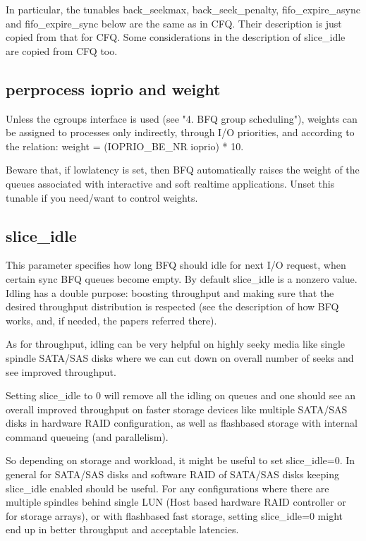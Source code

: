\documentclass[a4paper,11pt,english]{sphinxmanual}
\begin{document}
In particular, the tunables back\_seek\sphinxhyphen{}max, back\_seek\_penalty,
fifo\_expire\_async and fifo\_expire\_sync below are the same as in
CFQ. Their description is just copied from that for CFQ. Some
considerations in the description of slice\_idle are copied from CFQ
too.


\subsection{per\sphinxhyphen{}process ioprio and weight}
\label{\detokenize{bfq-iosched:per-process-ioprio-and-weight}}
Unless the cgroups interface is used (see "4. BFQ group scheduling"),
weights can be assigned to processes only indirectly, through I/O
priorities, and according to the relation:
weight = (IOPRIO\_BE\_NR \sphinxhyphen{} ioprio) * 10.

Beware that, if low\sphinxhyphen{}latency is set, then BFQ automatically raises the
weight of the queues associated with interactive and soft real\sphinxhyphen{}time
applications. Unset this tunable if you need/want to control weights.


\subsection{slice\_idle}
\label{\detokenize{bfq-iosched:slice-idle}}
This parameter specifies how long BFQ should idle for next I/O
request, when certain sync BFQ queues become empty. By default
slice\_idle is a non\sphinxhyphen{}zero value. Idling has a double purpose: boosting
throughput and making sure that the desired throughput distribution is
respected (see the description of how BFQ works, and, if needed, the
papers referred there).

As for throughput, idling can be very helpful on highly seeky media
like single spindle SATA/SAS disks where we can cut down on overall
number of seeks and see improved throughput.

Setting slice\_idle to 0 will remove all the idling on queues and one
should see an overall improved throughput on faster storage devices
like multiple SATA/SAS disks in hardware RAID configuration, as well
as flash\sphinxhyphen{}based storage with internal command queueing (and
parallelism).

So depending on storage and workload, it might be useful to set
slice\_idle=0.  In general for SATA/SAS disks and software RAID of
SATA/SAS disks keeping slice\_idle enabled should be useful. For any
configurations where there are multiple spindles behind single LUN
(Host based hardware RAID controller or for storage arrays), or with
flash\sphinxhyphen{}based fast storage, setting slice\_idle=0 might end up in better
throughput and acceptable latencies.
\end{document}
